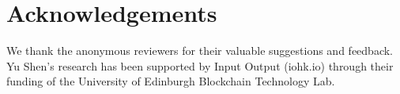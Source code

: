 \section*{Acknowledgements}

We thank the anonymous reviewers for their valuable suggestions and feedback.
%
Yu Shen's research has been supported by Input Output (iohk.io) through their funding of the University of Edinburgh Blockchain Technology Lab.